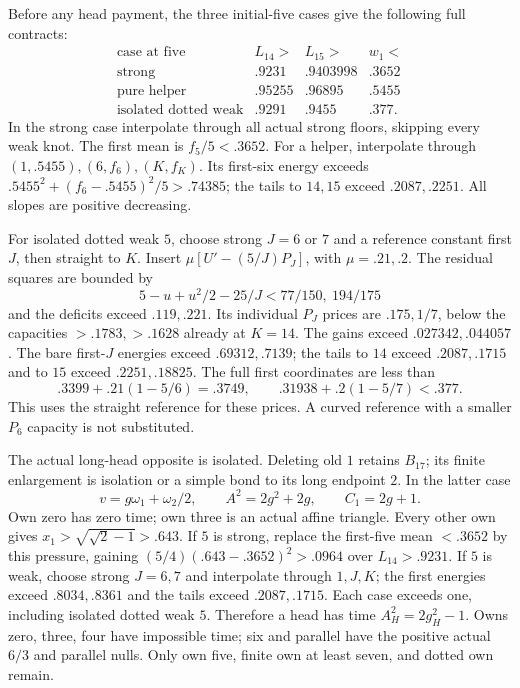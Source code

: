 \documentclass[11pt]{article}
\theoremstyle{definition}
\theoremstyle{remark}
\begin{document}
Before any head payment, the three initial-five cases give the
following full contracts:
\[
\begin{array}{c|cc|c}
\text{case at five}&L_{14}>&L_{15}>&w_1<\\ \hline
\text{strong}&.9231&.9403998&.3652\\
\text{pure helper}&.95255&.96895&.5455\\
\text{isolated dotted weak}&.9291&.9455&.377 .
\end{array}
\]
In the strong case interpolate through all actual strong floors,
skipping every weak knot. The first mean is \(f_5/5<.3652\).
For a helper, interpolate through \((1,.5455),(6,f_6),(K,f_K)\).
Its first-six energy exceeds
\(.5455^2+(f_6-.5455)^2/5>.74385\);
the tails to \(14,15\) exceed \(.2087,.2251\).
All slopes are positive decreasing.

For isolated dotted weak \(5\), choose strong \(J=6\) or \(7\)
and a reference constant first \(J\), then straight to \(K\).
Insert \(\mu[U'-(5/J)P_J]\), with \(\mu=.21,.2\).
The residual squares are bounded by
\[
 5-u+u^2/2-25/J<77/150,\ 194/175
\]
and the deficits exceed \(.119,.221\).
Its individual \(P_J\) prices are \(.175,1/7\),
below the capacities \(>.1783,>.1628\) already at \(K=14\).
The gains exceed \(.027342,.044057\).
The bare first-\(J\) energies exceed \(.69312,.7139\);
the tails to \(14\) exceed \(.2087,.1715\) and to \(15\)
exceed \(.2251,.18825\).
The full first coordinates are less than
\[
 .3399+.21(1-5/6)=.3749,\qquad
 .31938+.2(1-5/7)<.377.
\]
This uses the straight reference for these prices. A curved
reference with a smaller \(P_6\) capacity is not substituted.

The actual long-head opposite is isolated. Deleting old \(1\)
retains \(B_{17}\); its finite enlargement is isolation or a
simple bond to its long endpoint \(2\). In the latter case
\[
 v=g\omega_1+\omega_2/2,\qquad A^2=2g^2+2g,\qquad C_1=2g+1.
\]
Own zero has zero time; own three is an actual affine triangle.
Every other own gives \(x_1>\sqrt{\sqrt2-1}>.643\).
If \(5\) is strong, replace the first-five mean \(<.3652\)
by this pressure, gaining
\((5/4)(.643-.3652)^2>.0964\) over \(L_{14}>.9231\).
If \(5\) is weak, choose strong \(J=6,7\) and interpolate
through \(1,J,K\); the first energies exceed \(.8034,.8361\)
and the tails exceed \(.2087,.1715\).
Each case exceeds one, including isolated dotted weak \(5\).
Therefore a head has time \(A_H^2=2g_H^2-1\).
Owns zero, three, four have impossible time; six and parallel
have the positive actual \(6/3\) and parallel nulls.
Only own five, finite own at least seven, and dotted own remain.
\end{document}
